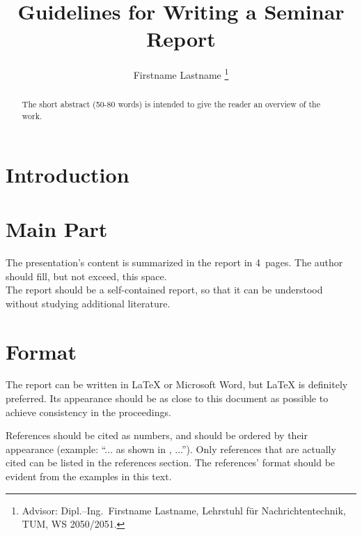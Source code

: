 \documentclass[journal, a4paper]{IEEEtran}
\begin{document}
\title{Guidelines for Writing a Seminar Report}
\author{Firstname Lastname
  \thanks{Advisor: Dipl.--Ing.~Firstname Lastname, Lehrstuhl f\"ur Nachrichtentechnik, TUM, WS 2050/2051.}}
\maketitle

\begin{abstract}
  The short abstract (50-80 words) is intended to give the reader an overview of the work.
\end{abstract}

\section{Introduction}

\section{Main Part}
The presentation's content is summarized in the report in 4~pages.
The author should fill, but not exceed, this space. \\
The report should be a self-contained report, so that it can be understood without studying additional literature.

\section{Format}
The report can be written in \LaTeX{} or Microsoft Word, but \LaTeX{} is definitely preferred.
Its appearance should be as close to this document as possible to achieve consistency in the proceedings.

References should be cited as numbers, and should be ordered by their appearance (example: ``... as shown in \cite{HOP96}, ...'').
Only references that are actually cited can be listed in the references section.
The references' format should be evident from the examples in this text.
\end{document}
